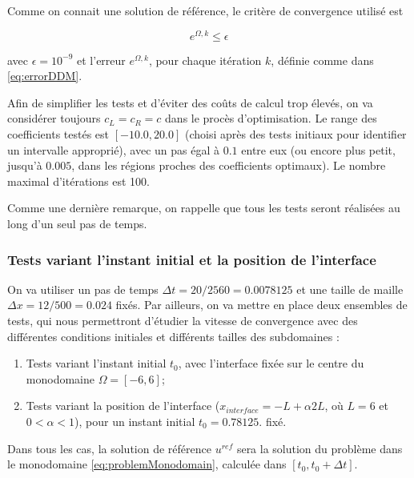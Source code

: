 \indent Comme on connait une solution de référence, le critère de convergence utilisé est

\begin{equation*}
\label{eq:criteriaConvergence}
	e^{\Omega,k} \leq \epsilon
\end{equation*}

\noindent avec $\epsilon = 10^{-9}$ et  l'erreur $e^{\Omega,k}$, pour chaque itération $k$, définie comme dans \eqref{eq:errorDDM}.

\indent Afin de simplifier les tests et d'éviter des coûts de calcul trop élevés,  on va considérer toujours $c_L = c_R = c$  dans le procès d'optimisation. Le range des coefficients testés est $[-10.0, 20.0]$ (choisi après des tests initiaux pour identifier un intervalle approprié), avec un pas égal à  $0.1$ entre eux (ou encore plus petit, jusqu'à $0.005$, dans les régions proches des coefficients optimaux). Le nombre maximal d'itérations est 100.

\indent Comme une dernière remarque, on rappelle que tous les tests seront réalisées au long d'un seul pas de temps.

\subsubsection{Tests variant l'instant initial et la position de l'interface}

\indent On va utiliser un pas de temps $\Delta t = 20/2560 = 0.0078125$ et une taille de maille $\Delta x = 12/500 = 0.024$ fixés. Par ailleurs, on va mettre en place deux ensembles de tests, qui nous permettront d'étudier la vitesse de convergence avec des différentes conditions initiales et différents tailles des subdomaines :

\begin{enumerate}
	\item Tests variant l'instant initial $t_0$, avec l'interface fixée sur le centre du monodomaine $\Omega = [-6,6]$;
	\item Tests variant la position de l'interface ($x_{interface} = -L + \alpha 2L$, où  $L = 6$ et $0 < \alpha < 1$), pour un instant initial $t_0 = 0.78125$. fixé.
\end{enumerate}

\indent Dans tous les cas, la solution de référence $u^{ref}$ sera la solution du problème dans le monodomaine \eqref{eq:problemMonodomain}, calculée dans $[t_0,t_0 + \Delta t]$.

